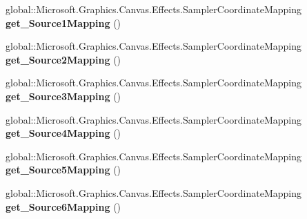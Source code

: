 \begin{DoxyCompactItemize}
\mbox{\label{class_microsoft_1_1_graphics_1_1_canvas_1_1_effects_1_1_pixel_shader_effect_a91f0b0cbe92382609bedca2e06934faf}} 
global\+::\+Microsoft.\+Graphics.\+Canvas.\+Effects.\+Sampler\+Coordinate\+Mapping {\bfseries get\+\_\+\+Source1\+Mapping} ()
\item 
\mbox{\label{class_microsoft_1_1_graphics_1_1_canvas_1_1_effects_1_1_pixel_shader_effect_aaf64a0d452c25ea86a1b4f42076f1477}} 
global\+::\+Microsoft.\+Graphics.\+Canvas.\+Effects.\+Sampler\+Coordinate\+Mapping {\bfseries get\+\_\+\+Source2\+Mapping} ()
\item 
\mbox{\label{class_microsoft_1_1_graphics_1_1_canvas_1_1_effects_1_1_pixel_shader_effect_a2975ebfdfd4be4b6bfbae45ff6ddeefc}} 
global\+::\+Microsoft.\+Graphics.\+Canvas.\+Effects.\+Sampler\+Coordinate\+Mapping {\bfseries get\+\_\+\+Source3\+Mapping} ()
\item 
\mbox{\label{class_microsoft_1_1_graphics_1_1_canvas_1_1_effects_1_1_pixel_shader_effect_a2a0bbbc05e89d5121edc3ca491a8816c}} 
global\+::\+Microsoft.\+Graphics.\+Canvas.\+Effects.\+Sampler\+Coordinate\+Mapping {\bfseries get\+\_\+\+Source4\+Mapping} ()
\item 
\mbox{\label{class_microsoft_1_1_graphics_1_1_canvas_1_1_effects_1_1_pixel_shader_effect_aeee501a08ce20b60bfdeefbaaba26f94}} 
global\+::\+Microsoft.\+Graphics.\+Canvas.\+Effects.\+Sampler\+Coordinate\+Mapping {\bfseries get\+\_\+\+Source5\+Mapping} ()
\item 
\mbox{\label{class_microsoft_1_1_graphics_1_1_canvas_1_1_effects_1_1_pixel_shader_effect_a6f3acf01120774e1265050c177eb006d}} 
global\+::\+Microsoft.\+Graphics.\+Canvas.\+Effects.\+Sampler\+Coordinate\+Mapping {\bfseries get\+\_\+\+Source6\+Mapping} ()
\item 
\mbox{\label{class_microsoft_1_1_graphics_1_1_canvas_1_1_effects_1_1_pixel_shader_effect_af925d090287dd535c79479defee3049e}} 

\end{DoxyCompactItemize}
